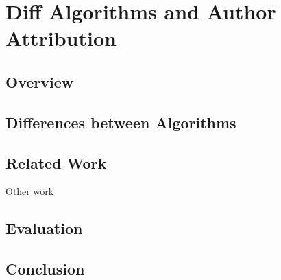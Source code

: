 \chapter{Diff Algorithms and Author Attribution}
\label{sec-diff}



\section{Overview}
    \section{Differences between Algorithms}

\section{Related Work}
    Other work~\cite{White2010,Fong2010}

\section{Evaluation}
\section{Conclusion}

